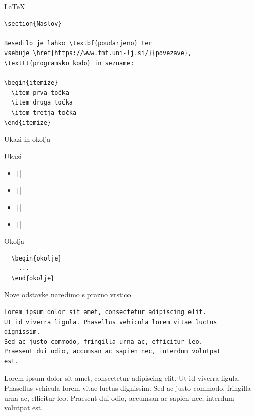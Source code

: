 \documentclass[aspectratio=169]{beamer}
\begin{document}
\begin{frame}[fragile]{\LaTeX}

\begin{verbatim}
\section{Naslov}

Besedilo je lahko \textbf{poudarjeno} ter
vsebuje \href{https://www.fmf.uni-lj.si/}{povezave},
\texttt{programsko kodo} in sezname:

\begin{itemize}
  \item prva točka
  \item druga točka
  \item tretja točka
\end{itemize}
\end{verbatim}

\end{frame}

\begin{frame}[fragile]{Ukazi in okolja}

  \begin{block}{Ukazi}
    \begin{itemize}
      \item \texttt|\ukaz|
      \item \texttt||
      \item \texttt||
      \item \texttt||
    \end{itemize}
  \end{block}

  \begin{block}{Okolja}
    \begin{verbatim}
  \begin{okolje}
    ...
  \end{okolje}
    \end{verbatim}
  \end{block}
\end{frame}

\begin{frame}[fragile]{Nove odstavke naredimo s prazno vrstico}
  \begin{slaboenv}
    \begin{verbatim}
Lorem ipsum dolor sit amet, consectetur adipiscing elit.
Ut id viverra ligula. Phasellus vehicula lorem vitae luctus
dignissim.
Sed ac justo commodo, fringilla urna ac, efficitur leo.
Praesent dui odio, accumsan ac sapien nec, interdum volutpat
est.
    \end{verbatim}

    Lorem ipsum dolor sit amet, consectetur adipiscing elit.
    Ut id viverra ligula. Phasellus vehicula lorem vitae luctus
    dignissim.
    Sed ac justo commodo, fringilla urna ac, efficitur leo.
    Praesent dui odio, accumsan ac sapien nec, interdum volutpat
    est.
  \end{slaboenv}
\end{frame}
\end{document}
